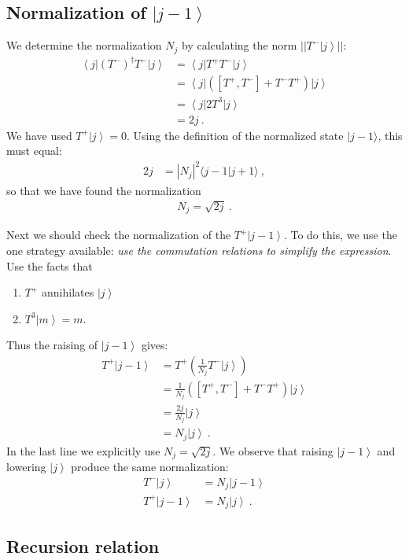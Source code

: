 \documentclass[12pt]{article}
\numberwithin{equation}{section}
\newcommand{\ket}[1]{\left|#1\right\rangle}    %
\newcommand{\bra}[1]{\left\langle#1\right|}    %
\begin{document}
\subsection{Normalization of $\ket{j-1}$}

We determine the normalization $N_j$ by calculating the norm $|| T^-\ket{j}||$:
\begin{align}
	\bra{j} \left(T^-\right)^\dag T^- \ket{j} 
	& = \bra{j} T^+ T^- \ket{j} \\
	& = \bra{j} \left( [T^+, T^-] + T^-T^+ \right) \ket{j} \\
	& = \bra{j} 2T^3 \ket{j} \\
	& = 2j \ .
\end{align}
We have used $T^+\ket{j} = 0$. Using the definition of the normalized state $|j-1\rangle$, this must equal:
\begin{align}
	2j & = |N_j|^2 \langle j -1 | j+1 \rangle \ ,
\end{align}
so that we have found the normalization
\begin{align}
	N_ j = \sqrt{2j} \ .
\end{align}

Next we should check the normalization of the $T^+\ket{j-1}$. To do this, we use the one strategy available: \emph{use the commutation relations to simplify the expression}. Use the facts that
\begin{enumerate}
	\item $T^+$ annihilates $\ket{j}$
	\item $T^3\ket{m} = m$.
\end{enumerate}
Thus the raising of $\ket{j-1}$ gives:
\begin{align}
	T^+ \ket{j-1} &= T^+ \left( \frac{1}{N_j} T^- \ket{j} \right) \\
	& = \frac{1}{N_j}\left( [T^+,T^-] + T^-T^+ \right) \ket{j} \\
	& = \frac{2j}{N_j} \ket{j} \\
	& = N_j \ket{j} \ .
\end{align}
In the last line we explicitly use $N_j = \sqrt{2j}$. We observe that raising $\ket{j-1}$ and lowering $\ket{j}$ produce the same normalization:
\begin{align}
	T^- \ket{j} &= N_j \ket{j-1}\\
	T^+ \ket{j-1} &= N_j \ket{j} \ .
\end{align}

\subsection{Recursion relation}
\end{document}
